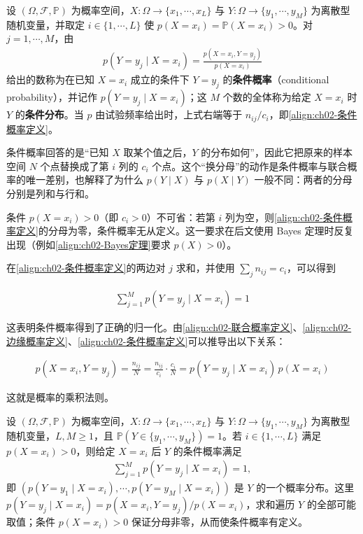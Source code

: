 \documentclass[../../main.tex]{subfiles}
\begin{document}
\begin{definition}[条件概率]\label{definition:ch02-条件概率}
设 $(\Omega,\mathcal{F},\mathbb{P})$ 为概率空间，$X:\Omega\to\{x_1,\cdots,x_L\}$ 与 $Y:\Omega\to\{y_1,\cdots,y_M\}$ 为离散型随机变量，并取定 $i\in\{1,\cdots,L\}$ 使 $p(X=x_i)=\mathbb{P}(X=x_i)>0$。对 $j=1,\cdots,M$，由
\begin{align*}
  p(Y=y_j\mid X=x_i)=\frac{p(X=x_i,Y=y_j)}{p(X=x_i)}
\end{align*}
给出的数称为在已知 $X=x_i$ 成立的条件下 $Y=y_j$ 的\textbf{条件概率}（conditional probability），并记作 $p(Y=y_j\mid X=x_i)$；这 $M$ 个数的全体称为给定 $X=x_i$ 时 $Y$ 的\textbf{条件分布}。当 $p$ 由试验频率给出时，上式右端等于 $n_{ij}/c_i$，即\eqref{align:ch02-条件概率定义}。
\end{definition}

\begin{remark}
条件概率回答的是“已知 $X$ 取某个值之后，$Y$ 的分布如何”，因此它把原来的样本空间 $N$ 个点替换成了第 $i$ 列的 $c_i$ 个点。这个“换分母”的动作是条件概率与联合概率的唯一差别，也解释了为什么 $p(Y\mid X)$ 与 $p(X\mid Y)$ 一般不同：两者的分母分别是列和与行和。

条件 $p(X=x_i)>0$（即 $c_i>0$）不可省：若第 $i$ 列为空，则\eqref{align:ch02-条件概率定义}的分母为零，条件概率无从定义。这一要求在后文使用 Bayes 定理时反复出现（例如\eqref{align:ch02-Bayes定理}要求 $p(X)>0$）。
\end{remark}

在\eqref{align:ch02-条件概率定义}的两边对 $j$ 求和，并使用 $\sum_j n_{ij}=c_i$，可以得到

\begin{align}
  \sum_{j=1}^{M} p(Y=y_j\mid X=x_i) = 1
  \label{align:ch02-条件概率归一化}
\end{align}

这表明条件概率得到了正确的归一化。由\eqref{align:ch02-联合概率定义}、\eqref{align:ch02-边缘概率定义}、\eqref{align:ch02-条件概率定义}可以推导出以下关系：

\begin{align}
  p(X=x_i,Y=y_j) = \frac{n_{ij}}{N} = \frac{n_{ij}}{c_i}\cdot\frac{c_i}{N} = p(Y=y_j\mid X=x_i)\,p(X=x_i)
  \label{align:ch02-乘积法则离散}
\end{align}

这就是概率的乘积法则。

\begin{proposition}[条件概率的归一化]\label{proposition:ch02-条件概率归一化}
设 $(\Omega,\mathcal{F},\mathbb{P})$ 为概率空间，$X:\Omega\to\{x_1,\cdots,x_L\}$ 与 $Y:\Omega\to\{y_1,\cdots,y_M\}$ 为离散型随机变量，$L,M\geqslant1$，且 $\mathbb{P}(Y\in\{y_1,\cdots,y_M\})=1$。若 $i\in\{1,\cdots,L\}$ 满足 $p(X=x_i)>0$，则给定 $X=x_i$ 后 $Y$ 的条件概率满足
\begin{align*}
  \sum_{j=1}^{M}p(Y=y_j\mid X=x_i)=1,
\end{align*}
即 $(p(Y=y_1\mid X=x_i),\cdots,p(Y=y_M\mid X=x_i))$ 是 $Y$ 的一个概率分布。这里 $p(Y=y_j\mid X=x_i)=p(X=x_i,Y=y_j)/p(X=x_i)$，求和遍历 $Y$ 的全部可能取值；条件 $p(X=x_i)>0$ 保证分母非零，从而使条件概率有定义。
\end{proposition}
\end{document}
